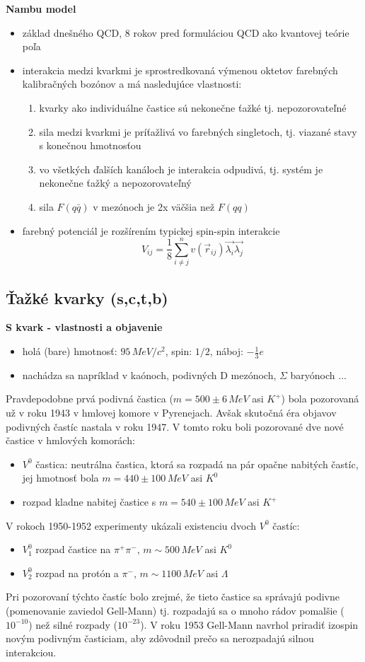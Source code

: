 \documentclass[../../main.tex]{subfiles}
\begin{document}
\textbf{Nambu model}
\begin{itemize}
\item základ dnešného QCD, 8 rokov pred formuláciou QCD ako kvantovej teórie poľa
\item interakcia medzi kvarkmi je sprostredkovaná výmenou oktetov farebných kalibračných bozónov a má nasledujúce vlastnosti:
\begin{enumerate}
\item kvarky ako individuálne častice sú nekonečne ťažké tj. nepozorovateľné
\item sila medzi kvarkmi je príťažlivá vo farebných singletoch, tj. viazané stavy s konečnou hmotnosťou
\item vo všetkých ďalších kanáloch je interakcia odpudivá, tj. systém je nekonečne ťažký a nepozorovateľný 
\item sila $F(q\bar{q})$ v mezónoch je 2x väčšia než $F(qq)$ 
\end{enumerate}
\item farebný potenciál je rozšírením typickej spin-spin interakcie
$$ V_{ij} = \frac{1}{8} \sum_{i \neq j}^{n} v(\vec{r}_{ij}) \vec{\lambda_{i}}\vec{\lambda_{j}} $$
\end{itemize}

\subsection{Ťažké kvarky (s,c,t,b)}
\textbf{S kvark - vlastnosti a objavenie}
\begin{itemize}
\item holá (bare) hmotnosť: $95\,\unit{MeV}/c^2$, spin: $1/2$, náboj: $-\frac{1}{3}e$ 
\item nachádza sa napríklad v kaónoch, podivných D mezónoch, $\Sigma$ baryónoch ...
\end{itemize}

Pravdepodobne prvá podivná častica ($m=500\pm 6 \,MeV$ asi $K^{+}$) bola pozorovaná už v roku 1943 v hmlovej komore v Pyrenejach. Avšak skutočná éra objavov podivných častíc nastala v roku 1947. V tomto roku boli pozorované dve nové častice v hmlových komorách:
\begin{itemize}
\item $V^{0}$ častica: neutrálna častica, ktorá sa rozpadá na pár opačne nabitých častíc, jej hmotnosť bola $m=440\pm 100 \,MeV$ asi $K^{0}$
\item rozpad kladne nabitej častice s $m=540\pm 100 \,MeV$ asi $K^{+}$
\end{itemize}
V rokoch 1950-1952 experimenty ukázali existenciu dvoch $V^{0}$ častíc:
\begin{itemize}
\item $V^{0}_1$ rozpad častice na $\pi^{+}\pi^{-}$, $m \sim 500 \,MeV$ asi $K^{0}$
\item $V^{0}_2$ rozpad na protón a $\pi^{-}$, $m \sim 1100 \,MeV$ asi $\Lambda$
\end{itemize}
Pri pozorovaní týchto častíc bolo zrejmé, že tieto častice sa správajú podivne (pomenovanie zaviedol Gell-Mann) tj. rozpadajú sa o mnoho rádov pomalšie ($10^{-10}$) než silné rozpady ($10^{-23}$). V roku 1953 Gell-Mann navrhol priradiť izospin novým podivným časticiam, aby zdôvodnil prečo sa nerozpadajú silnou interakciou.
\end{document}
